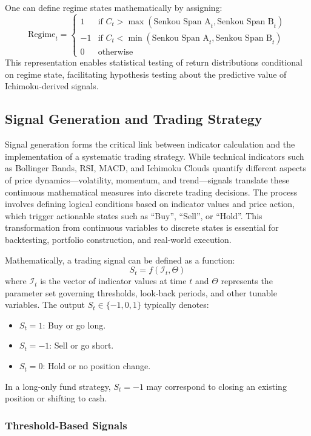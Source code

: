 One can define regime states mathematically by assigning:
\[
\text{Regime}_t =
\begin{cases}
1 & \text{if } C_t > \max(\text{Senkou Span A}_t, \text{Senkou Span B}_t) \\
-1 & \text{if } C_t < \min(\text{Senkou Span A}_t, \text{Senkou Span B}_t) \\
0 & \text{otherwise}
\end{cases}
\]
This representation enables statistical testing of return distributions conditional on regime state, facilitating hypothesis testing about the predictive value of Ichimoku-derived signals.

\subsection{Signal Generation and Trading Strategy}

Signal generation forms the critical link between indicator calculation and the implementation of a systematic trading strategy. While technical indicators such as Bollinger Bands, RSI, MACD, and Ichimoku Clouds quantify different aspects of price dynamics—volatility, momentum, and trend—signals translate these continuous mathematical measures into discrete trading decisions. The process involves defining logical conditions based on indicator values and price action, which trigger actionable states such as ``Buy'', ``Sell'', or ``Hold''. This transformation from continuous variables to discrete states is essential for backtesting, portfolio construction, and real-world execution.

Mathematically, a trading signal can be defined as a function:
\[
S_t = f(\mathcal{I}_t, \Theta)
\]
where $\mathcal{I}_t$ is the vector of indicator values at time $t$ and $\Theta$ represents the parameter set governing thresholds, look-back periods, and other tunable variables. The output $S_t \in \{-1, 0, 1\}$ typically denotes:
\begin{itemize}
    \item $S_t = 1$: Buy or go long.
    \item $S_t = -1$: Sell or go short.
    \item $S_t = 0$: Hold or no position change.
\end{itemize}
In a long-only fund strategy, $S_t = -1$ may correspond to closing an existing position or shifting to cash.

\subsubsection{Threshold-Based Signals}

